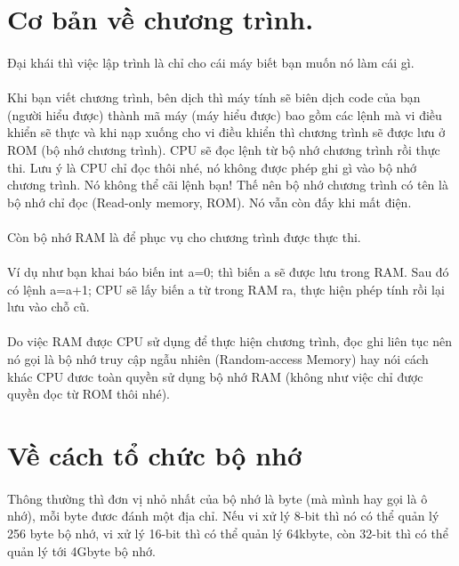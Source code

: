 \documentclass[12pt,a5paper]{book}
\begin{document}
	\section{Cơ bản về chương trình.}
	\paragraph{} 
Đại khái thì việc lập trình là chỉ cho cái máy biết bạn muốn nó làm cái gì.
	\paragraph{}
Khi bạn viết chương trình, bên dịch thì máy tính sẽ biên dịch code của bạn (người hiểu được) thành mã máy (máy hiểu được) bao gồm các lệnh mà vi điều khiển sẽ thực và khi nạp xuống cho vi điều khiển thì chương trình sẽ được lưu ở ROM (bộ nhớ chương trình). CPU sẽ đọc lệnh từ bộ nhớ chương trình rồi thực thi. Lưu ý là CPU chỉ đọc thôi nhé, nó không được phép ghi gì vào bộ nhớ chương trình. Nó không thể cãi lệnh bạn! Thế nên bộ nhớ chương trình có tên là bộ nhớ chỉ đọc (Read-only memory, ROM). Nó vẫn còn đấy khi mất điện.
	\paragraph{}
Còn bộ nhớ RAM là để phục vụ cho chương trình được thực thi.
	\paragraph{}
Ví dụ như bạn khai báo biến int a=0; thì biến a sẽ được lưu trong RAM. Sau đó có lệnh a=a+1; CPU sẽ lấy biến a từ trong RAM ra, thực hiện phép tính rồi lại lưu vào chỗ cũ.
	\paragraph{}
Do việc RAM được CPU sử dụng để thực hiện chương trình, đọc ghi liên tục nên nó gọi là bộ nhớ truy cập ngẫu nhiên (Random-access Memory) hay nói cách khác CPU đươc toàn quyền sử dụng bộ nhớ RAM (không như việc chỉ được quyền đọc từ ROM thôi nhé).



	\section{Về cách tổ chức bộ nhớ}
	\paragraph{}
	Thông thường thì đơn vị nhỏ nhất của bộ nhớ là byte (mà mình hay gọi là ô nhớ), mỗi byte đươc đánh một địa chỉ. Nếu vi xử lý 8-bit thì nó có thể quản lý 256 byte bộ nhớ, vi xử lý 16-bit thì có thể quản lý 64kbyte, còn 32-bit thì có thể quản lý tới 4Gbyte bộ nhớ. 
	
\end{document}
